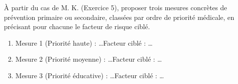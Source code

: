 \documentclass[11pt]{article}
\begin{document}
\begin{exercice}
À partir du cas de M. K. (Exercice 5), proposer trois mesures concrètes de prévention primaire ou secondaire, classées par ordre de priorité médicale, en précisant pour chacune le facteur de risque ciblé.
\begin{enumerate}
    \item Mesure 1 (Priorité haute) : \ldots \quad Facteur ciblé : \ldots
    \item Mesure 2 (Priorité moyenne) : \ldots \quad Facteur ciblé : \ldots
    \item Mesure 3 (Priorité éducative) : \ldots \quad Facteur ciblé : \ldots
\end{enumerate}
\end{exercice}
\end{document}
